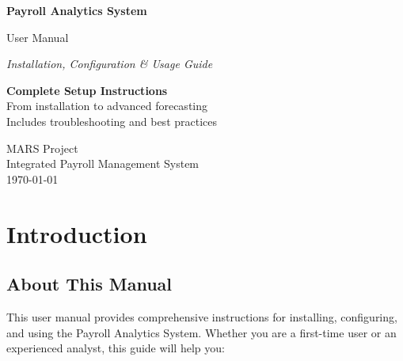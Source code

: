 \documentclass[11pt,a4paper]{article}
\begin{document}
\begin{titlepage}
    \centering
    \vspace*{2cm}
    
    {\Huge\bfseries\color{primaryblue} Payroll Analytics System\par}
    \vspace{0.5cm}
    {\LARGE User Manual\par}
    \vspace{2cm}
    
    {\Large\itshape Installation, Configuration \& Usage Guide\par}
    \vspace{3cm}
    
    \begin{tcolorbox}[colback=infobox, colframe=primaryblue, width=0.8\textwidth]
        \centering
        \large
        \textbf{Complete Setup Instructions}\\[0.5cm]
        From installation to advanced forecasting\\[0.2cm]
        Includes troubleshooting and best practices
    \end{tcolorbox}
    
    \vfill
    
    {\large MARS Project\\
    Integrated Payroll Management System\\[0.3cm]
    \today\par}
\end{titlepage}

\tableofcontents
\newpage

\section{Introduction}

\subsection{About This Manual}

This user manual provides comprehensive instructions for installing, configuring, and using the Payroll Analytics System. Whether you are a first-time user or an experienced analyst, this guide will help you:
\end{document}
